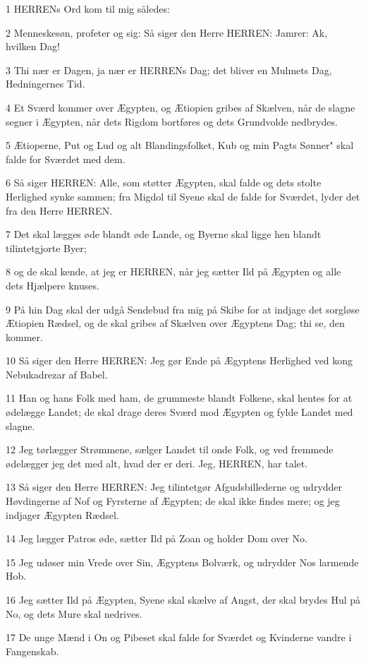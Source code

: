 \par 1 HERRENs Ord kom til mig således:
\par 2 Menneskesøn, profeter og sig: Så siger den Herre HERREN: Jamrer: Ak, hvilken Dag!
\par 3 Thi nær er Dagen, ja nær er HERRENs Dag; det bliver en Mulmets Dag, Hedningernes Tid.
\par 4 Et Sværd kommer over Ægypten, og Ætiopien gribes af Skælven, når de slagne segner i Ægypten, når dets Rigdom bortføres og dets Grundvolde nedbrydes.
\par 5 Ætioperne, Put og Lud og alt Blandingsfolket, Kub og min Pagts Sønner" skal falde for Sværdet med dem.
\par 6 Så siger HERREN: Alle, som støtter Ægypten, skal falde og dets stolte Herlighed synke sammen; fra Migdol til Syene skal de falde for Sværdet, lyder det fra den Herre HERREN.
\par 7 Det skal lægges øde blandt øde Lande, og Byerne skal ligge hen blandt tilintetgjorte Byer;
\par 8 og de skal kende, at jeg er HERREN, når jeg sætter Ild på Ægypten og alle dets Hjælpere knuses.
\par 9 På hin Dag skal der udgå Sendebud fra mig på Skibe for at indjage det sorgløse Ætiopien Rædsel, og de skal gribes af Skælven over Ægyptens Dag; thi se, den kommer.
\par 10 Så siger den Herre HERREN: Jeg gør Ende på Ægyptens Herlighed ved kong Nebukadrezar af Babel.
\par 11 Han og hans Folk med ham, de grummeste blandt Folkene, skal hentes for at ødelægge Landet; de skal drage deres Sværd mod Ægypten og fylde Landet med slagne.
\par 12 Jeg tørlægger Strømmene, sælger Landet til onde Folk, og ved fremmede ødelægger jeg det med alt, hvad der er deri. Jeg, HERREN, har talet.
\par 13 Så siger den Herre HERREN: Jeg tilintetgør Afgudsbillederne og udrydder Høvdingerne af Nof og Fyrsterne af Ægypten; de skal ikke findes mere; og jeg indjager Ægypten Rædsel.
\par 14 Jeg lægger Patros øde, sætter Ild på Zoan og holder Dom over No.
\par 15 Jeg udøser min Vrede over Sin, Ægyptens Bolværk, og udrydder Nos larmende Hob.
\par 16 Jeg sætter Ild på Ægypten, Syene skal skælve af Angst, der skal brydes Hul på No, og dets Mure skal nedrives.
\par 17 De unge Mænd i On og Pibeset skal falde for Sværdet og Kvinderne vandre i Fangenskab.
